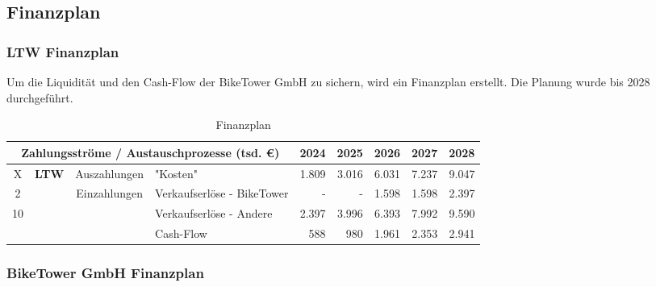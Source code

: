 \subsection{Finanzplan}

\subsubsection{LTW Finanzplan}

Um die Liquidität und den Cash-Flow der BikeTower GmbH zu sichern, wird ein Finanzplan erstellt. Die Planung wurde bis 2028 durchgeführt.

\begin{table}[H]
  \small
  \centering
  \begin{tabular}{ccclrrrrr}
    \toprule
    \multicolumn{4}{c}{\textbf{Zahlungsströme / Austauschprozesse} (tsd. \euro)} & \textbf{2024}                 & \textbf{2025}                 & \textbf{2026}              & \textbf{2027} & \textbf{2028}                         \\
    \midrule
    X                                                                            & \multirow{3}{*}{\textbf{LTW}} & Auszahlungen                  & "Kosten"                   & 1.809         & 3.016         & 6.031 & 7.237 & 9.047 \\
    2                                                                            &                               & \multirow{2}{*}{Einzahlungen} & Verkaufserlöse - BikeTower & -             & -             & 1.598 & 1.598 & 2.397 \\
    10                                                                           &                               &                               & Verkaufserlöse - Andere    & 2.397         & 3.996         & 6.393 & 7.992 & 9.590 \\
    \midrule
                                                                                 &                               &                               & Cash-Flow                  & 588           & 980           & 1.961 & 2.353 & 2.941 \\

    \bottomrule
  \end{tabular}
  \caption{Finanzplan}
  \label{tab:finanzplan}
\end{table}


\subsubsection{BikeTower GmbH Finanzplan}

